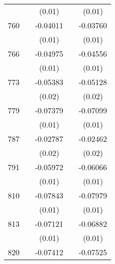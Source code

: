 \begin{table}[htbp]
\begin{tabular}{l*{4}{c}}
                    &                     &      (0.01)         &                     &      (0.01)         \\
760                 &                     &    -0.04011\sym{**} &                     &    -0.03760\sym{**} \\
                    &                     &      (0.01)         &                     &      (0.01)         \\
766                 &                     &    -0.04975\sym{***}&                     &    -0.04556\sym{***}\\
                    &                     &      (0.01)         &                     &      (0.01)         \\
773                 &                     &    -0.05383\sym{*}  &                     &    -0.05128\sym{*}  \\
                    &                     &      (0.02)         &                     &      (0.02)         \\
779                 &                     &    -0.07379\sym{***}&                     &    -0.07099\sym{***}\\
                    &                     &      (0.01)         &                     &      (0.01)         \\
787                 &                     &    -0.02787         &                     &    -0.02462         \\
                    &                     &      (0.02)         &                     &      (0.02)         \\
791                 &                     &    -0.05972\sym{***}&                     &    -0.06066\sym{***}\\
                    &                     &      (0.01)         &                     &      (0.01)         \\
810                 &                     &    -0.07843\sym{***}&                     &    -0.07979\sym{***}\\
                    &                     &      (0.01)         &                     &      (0.01)         \\
813                 &                     &    -0.07121\sym{***}&                     &    -0.06882\sym{***}\\
                    &                     &      (0.01)         &                     &      (0.01)         \\
820                 &                     &    -0.07412\sym{***}&                     &    -0.07525\sym{***}\\

\end{tabular}
\end{table}

